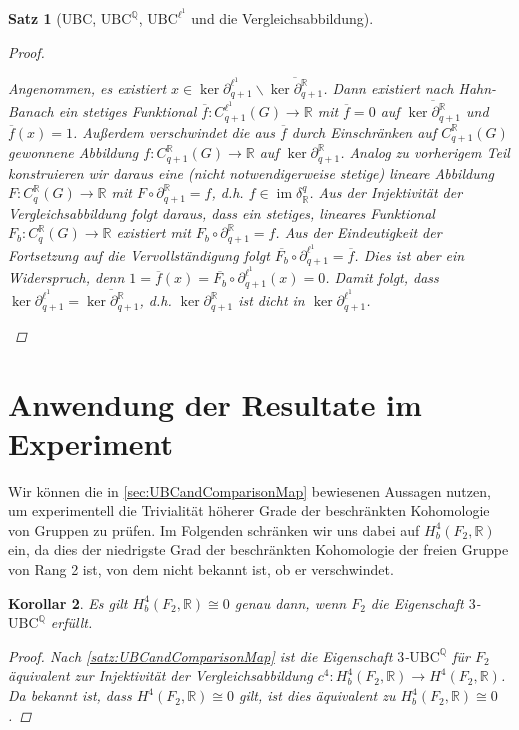 \documentclass[a4paper,twoside,10pt]{scrreprt}
\DeclareMathOperator{\img}{im}
\newcommand{\UBC}{\text{UBC}}
\newcommand{\Q}{\mathbb{Q}}
\newcommand{\R}{\mathbb{R}}
\newtheorem{satz}{Satz}[section]
\newtheorem{korollar}[satz]{Korollar}
\theoremstyle{definition}
\begin{document}
\begin{satz}[UBC, $\UBC^{\Q}$, $\UBC^{\ell^1}$ und die Vergleichsabbildung]
\begin{proof}
\begin{itemize}
Angenommen, es existiert $x\in \ker \partial_{q+1}^{\ell^1}\backslash\overline{\ker \partial_{q+1}^{\R}}$. Dann existiert nach Hahn-Banach ein stetiges Funktional $\overline{f}:C_{q+1}^{\ell^1}(G)\to \R$ mit $\overline{f}=0$ auf $\overline{\ker \partial_{q+1}^{\R}}$ und $\overline{f}(x)=1$. Außerdem verschwindet die aus $\overline{f}$ durch Einschränken auf $C_{q+1}^{\R}(G)$ gewonnene Abbildung $f:C_{q+1}^{\R}(G)\to \R$ auf $\ker \partial_{q+1}^{\R}$. Analog zu vorherigem Teil konstruieren wir daraus eine (nicht notwendigerweise stetige) lineare Abbildung $F:C_q^{\R}(G)\to \R$ mit $F\circ \partial_{q+1}^{\R}=f$, d.h. $f\in \img \delta_{\R}^q$. Aus der Injektivität der Vergleichsabbildung folgt daraus, dass ein stetiges, lineares Funktional $F_b:C_q^{\R}(G)\to \R$ existiert mit $F_b\circ \partial_{q+1}^{\R}=f$. Aus der Eindeutigkeit der Fortsetzung auf die Vervollständigung folgt $\overline{F_b}\circ \partial_{q+1}^{\ell^1}=\overline{f}$. Dies ist aber ein Widerspruch, denn $1=\overline{f}(x)=\overline{F_b}\circ \partial_{q+1}^{\ell^1}(x)=0$. Damit folgt, dass $\ker \partial_{q+1}^{\ell^1}=\overline{\ker \partial_{q+1}^{\R}}$, d.h. $\ker \partial_{q+1}^{\R}$ ist dicht in $\ker \partial_{q+1}^{\ell^1}$.
\end{itemize}
\end{proof}
\end{satz}

\section{Anwendung der Resultate im Experiment}
Wir können die in \cref{sec:UBCandComparisonMap} bewiesenen Aussagen nutzen, um experimentell die Trivialität höherer Grade der beschränkten Kohomologie von Gruppen zu prüfen. Im Folgenden schränken wir uns dabei auf $H_b^4(F_2,\R)$ ein, da dies der niedrigste Grad der beschränkten Kohomologie der freien Gruppe von Rang 2 ist, von dem nicht bekannt ist, ob er verschwindet.

\begin{korollar} 
Es gilt $H_b^4(F_2,\R)\cong 0$ genau dann, wenn $F_2$ die Eigenschaft $3$-$\text{UBC}^{\Q}$ erfüllt.
\begin{proof}
Nach \cref{satz:UBCandComparisonMap} ist die Eigenschaft $3$-$\text{UBC}^{\Q}$ für $F_2$ äquivalent zur Injektivität der Vergleichsabbildung $c^4:H_b^4(F_2,\R)\to H^4(F_2,\R)$. Da bekannt ist, dass $H^4(F_2,\R)\cong 0$ gilt, ist dies äquivalent zu $H_b^4(F_2,\R)\cong 0$.
\end{proof}
\end{korollar}
\end{document}
